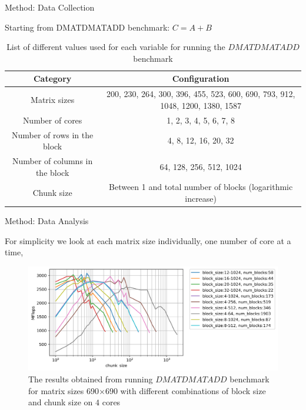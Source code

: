 \documentclass[10pt]{beamer}
\begin{document}
\begin{frame}{Method: Data Collection}
	\begin{outline}
		\1Starting from DMATDMATADD benchmark: $C=A+B$
	\begin{table}[H]
		\centering
		\resizebox{0.8\textwidth}{!}
		{\begin{tabular}{|c | c |} 
				\hline
				Category & Configuration \\
				\hline
				\hline
				Matrix sizes & 200, 230, 264, 300, 396, 455, 523, 600, 690, 793, 912, 1048, 1200, 1380, 1587 \\ [0.5ex] 
				\hline
				Number of cores & 1, 2, 3, 4, 5, 6, 7, 8 \\ 	
				\hline
				Number of rows in the block & 4, 8, 12, 16, 20, 32 \\
				\hline	
				Number of columns in the block & 64, 128, 256, 512, 1024 \\
				\hline
				Chunk size & Between 1 and total number of blocks (logarithmic increase)\\\hline
		\end{tabular}}
		
		\caption{List of different values used for each variable for running the $DMATDMATADD$ benchmark}
		\label{table1}
	\end{table}
	\end{outline}
\end{frame}


\begin{frame}{Method: Data Analysis}
	\begin{outline}
		\1For simplicity we look at each matrix size individually, one number of core at a time, 
		
		
		\begin{figure}
			\includegraphics[width=0.9\linewidth]{images/fig5.png}	
			\caption{The results obtained from running $DMATDMATADD$ benchmark for matrix sizes 690$\times$690 with different combinations of block size and chunk size on $4$ cores}	
		\end{figure}
	\end{outline}
\end{frame}
\end{document}
